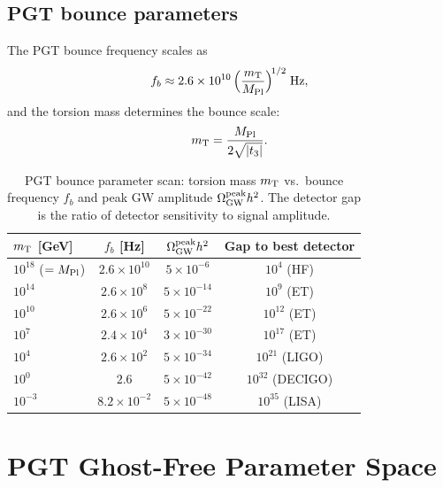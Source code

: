 \documentclass[aps,prd,twocolumn,superscriptaddress,showpacs,preprintnumbers,
  nofootinbib,longbibliography,floatfix]{revtex4-2}
\newcommand{\MPl}{M_{\rm Pl}}
\newcommand{\OmGW}{\Omega_{\rm GW}}
\newcommand{\mT}{m_{\rm T}}
\begin{document}
\subsection{PGT bounce parameters}

The PGT bounce frequency scales as
\begin{equation}\label{eq:fb_pgt}
  f_b \approx 2.6 \times 10^{10}\,
  \Bigl(\frac{\mT}{\MPl}\Bigr)^{\!1/2}\;\text{Hz},
\end{equation}
and the torsion mass determines the bounce scale:
\begin{equation}\label{eq:mT}
  \mT = \frac{\MPl}{2\sqrt{|t_3|}}.
\end{equation}

\begin{table}[t]
\centering
\caption{\label{tab:pgt_scan} PGT bounce parameter scan: torsion mass
$\mT$ vs.\ bounce frequency $f_b$ and peak GW amplitude
$\OmGW^{\rm peak}h^2$. The detector gap is the ratio of detector
sensitivity to signal amplitude.}
\begin{ruledtabular}
\begin{tabular}{lccc}
$\mT$ [GeV] & $f_b$ [Hz] & $\OmGW^{\rm peak}h^2$ & Gap to best detector \\
\hline
$10^{18}$ ($=\MPl$) & $2.6\times 10^{10}$ & $5\times 10^{-6}$ & $10^4$ (HF) \\
$10^{14}$ & $2.6\times 10^{8}$ & $5\times 10^{-14}$ & $10^9$ (ET) \\
$10^{10}$ & $2.6\times 10^{6}$ & $5\times 10^{-22}$ & $10^{12}$ (ET) \\
$10^{7}$ & $2.4\times 10^{4}$ & $3\times 10^{-30}$ & $10^{17}$ (ET) \\
$10^{4}$ & $2.6\times 10^{2}$ & $5\times 10^{-34}$ & $10^{21}$ (LIGO) \\
$10^{0}$ & $2.6$ & $5\times 10^{-42}$ & $10^{32}$ (DECIGO) \\
$10^{-3}$ & $8.2\times 10^{-2}$ & $5\times 10^{-48}$ & $10^{35}$ (LISA) \\
\end{tabular}
\end{ruledtabular}
\end{table}


\section{PGT Ghost-Free Parameter Space}\label{sec:ghost}
\end{document}
